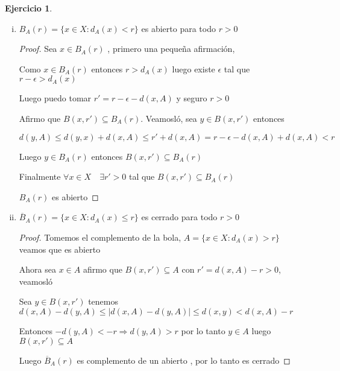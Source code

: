\documentclass[12pt]{report}
\newcommand{\Ra}{\Rightarrow}
\newcommand{\ol}{\overline}
\theoremstyle{definition}
\newtheorem{ej}{Ejercicio}
\begin{document}
\begin{ej}
\begin{enumerate}[i.]
\begin{proof}
	     $\iff x \in \ol A$
	  \end{proof}
    \item $B_A(r) = \{x \in X : d_A(x) < r \}$ es abierto para todo $r>0$
      \begin{proof}
	Sea $x \in B_A(r)$ , primero una pequeña afirmación, 

	Como $x \in B_A(r)$ entonces $r > d_A(x) $ luego existe $\epsilon$ tal que $r - \epsilon > d_A(x)$

	Luego puedo tomar $r' = r  - \epsilon - d(x,A)$ y seguro $r > 0$

	Afirmo que $B(x,r') \subseteq B_A(r)$. Veamosló, sea $y \in B(x,r')$ entonces 

	$d(y,A) \leq d(y,x) + d(x,A) \leq r' + d(x,A) = r - \epsilon - d(x,A) + d(x,A) <r$

	Luego $y \in B_A(r)$ entonces $B(x,r') \subseteq B_A(r)$ 

	Finalmente $\forall x \in X \quad \exists r' >0 $ tal que $B(x,r') \subseteq B_A(r)$ 

	$B_A(r)$ es abierto
      \end{proof}
    \item $\ol B_{A}(r) = \{x \in X : d_A(x) \leq r\} $ es cerrado para todo $r>0$
      \begin{proof}
	Tomemos el complemento de la bola, $A = \{x \in X : d_A(x) > r\}$ veamos que es abierto

	Ahora sea $x \in A$ afirmo que $B(x,r') \subseteq A$ con $r' = d(x,A) - r > 0 $, veamosló

	Sea $y \in B(x,r')$ tenemos $d(x,A) - d(y,A) \leq |d(x,A) - d(y,A)| \leq d(x,y) < d(x,A) -r $

      Entonces $-d(y,A) < -r \Ra d(y,A) > r$ por lo tanto $y \in A$ luego $B(x,r') \subseteq A$

      Luego $\ol B_A(r)$ es complemento de un abierto , por lo tanto es cerrado
      \end{proof}
  \end{enumerate}
\end{ej}
\end{document}
